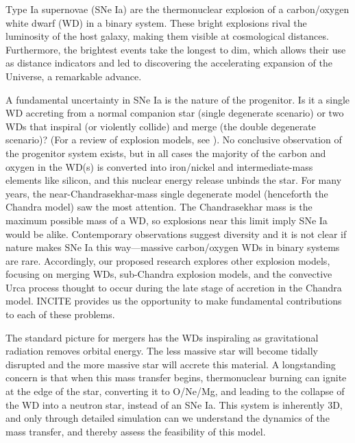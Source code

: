 Type Ia supernovae (SNe Ia) are the thermonuclear explosion of a
carbon/oxygen white dwarf (WD) in a binary system.  These bright
explosions rival the luminosity of the host galaxy, making them
visible at cosmological distances. Furthermore, the
brightest events take the longest to dim, which allows their use as
distance indicators and led to discovering the accelerating 
expansion of the Universe, a remarkable advance.

A fundamental uncertainty in SNe Ia is the nature
of the progenitor. Is it a single WD accreting from a normal companion star
(single degenerate scenario) or two WDs that inspiral (or
violently collide) and merge (the double degenerate scenario)? (For a
review of explosion models, see \cite{calder:2013}).  No conclusive 
observation of the progenitor system exists, but in all cases 
the majority of the carbon and oxygen in the WD(s) is converted into
iron/nickel and intermediate-mass elements like silicon, and this
nuclear energy release unbinds the star.
For many years, the near-Chandrasekhar-mass single degenerate model
(henceforth the Chandra model) saw the most attention.  The
Chandrasekhar mass is the maximum possible mass of a WD, so
explosions near this limit imply SNe Ia would be alike.  Contemporary
observations suggest diversity and it is not clear if nature makes SNe
Ia this way---massive carbon/oxygen WDs in binary systems are rare.  
Accordingly, our proposed research explores other explosion models,
focusing on merging WDs, sub-Chandra explosion models, and the convective 
Urca process thought to occur during the late stage of accretion in the
Chandra model.  INCITE provides us the opportunity to make fundamental
contributions to each of these problems.

The standard picture for mergers has the WDs
inspiraling as gravitational radiation removes orbital energy.
The less massive star will become tidally disrupted and the more
massive star will accrete this material.  A longstanding concern is
that when this mass transfer begins, thermonuclear burning can ignite
at the edge of the star, converting it to O/Ne/Mg, and leading to the
collapse of the WD into a neutron star, instead of an SNe Ia.
This system is inherently 3D, and only through detailed simulation
can we understand the dynamics of the mass transfer, and thereby
assess the feasibility of this model.

